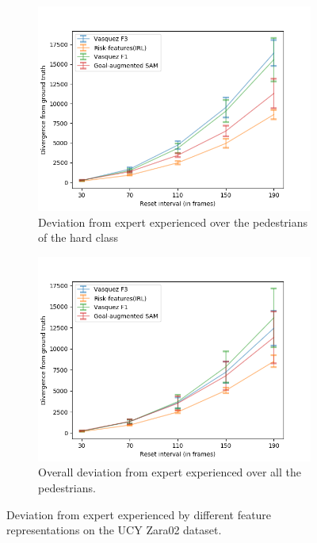 \begin{figure}[htbp]
\begin{subfigure}{0.5\textwidth}
		\label{fig:inter_IRL-drift_analysis_med-zara02}
	\end{subfigure}
	\begin{subfigure}{0.5\textwidth}
		\centering
		\includegraphics[width=\linewidth]{plots/plot_without_outliers/zara02_inter_irl_no_outlier/Zara02_irl_hard.png}
		\caption {Deviation from expert experienced over the pedestrians of the hard class}
		\label{fig:inter_IRL-drift_analysis_hard-zara02}
	\end{subfigure}
	\begin{subfigure}{0.5\textwidth}
		\centering
		\includegraphics[width=\linewidth]{plots/plot_without_outliers/zara02_inter_irl_no_outlier/Zara02_irl_all.png}
		\caption {Overall deviation from expert experienced over all the pedestrians.}
		\label{fig:inter_IRL-drift_analysis_all-zara02}
	\end{subfigure}
	\caption{Deviation from expert experienced by different feature representations on the UCY Zara02 dataset.}
	\label{fig:drift_analysis-inter_IRL-zara02}
\end{figure}



